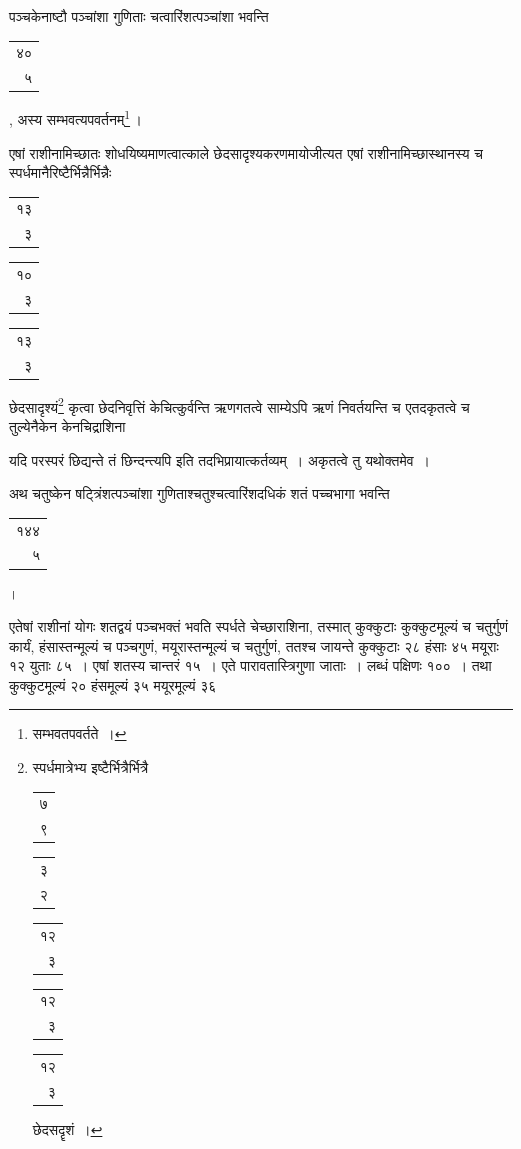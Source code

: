 \documentclass[10pt, openany]{book}
\begin{document}
{{{पञ्चकेनाष्टौ पञ्चांशा गुणिताः चत्वारिंशत्पञ्चांशा भवन्ति\begin{tabular}{r}४०\\ ५ \end{tabular}, अस्य
सम्भवत्यपवर्तनम्\renewcommand{\thefootnote}{\s ६}\footnote{\s सम्भवतपवर्तते~।}\,।}
{एषां राशीनामिच्छातः शोधयिष्यमाणत्वात्काले छेदसादृश्यकरणमायोजीत्यत एषां
राशीनामिच्छास्थानस्य च स्पर्धमानैरिष्टैर्भिन्नैर्भिन्नैः\begin{tabular}{r|}१३\\ ३ \end{tabular}\begin{tabular}{r|}१०\\ ३\end{tabular}\begin{tabular}{r}१३\\ ३\end{tabular}छेदसादृश्यं\renewcommand{\thefootnote}{\s ७}\footnote{\s स्पर्धमात्रेभ्य इष्टैर्भित्रैर्भित्रै\begin{tabular}{r|}७\\ ९\end{tabular}\begin{tabular}{r|}३\\ २\end{tabular}\begin{tabular}{r|}१२\\३\end{tabular}\begin{tabular}{r|} १२\\३\end{tabular}\begin{tabular}{r} १२\\३\end{tabular} छेदसदॄशं~।} कृत्वा छेदनिवृत्तिं केचित्कुर्वन्ति ऋणगतत्वे साम्येऽपि ऋणं निवर्तयन्ति च एतदकृतत्वे च
तुल्येनैकेन केनचिद्राशिना}
{यदि परस्परं छिद्यन्ते तं छिन्दन्त्यपि इति तदभिप्रायात्कर्तव्यम्~।
अकृतत्वे तु यथोक्तमेव~।}
{अथ चतुष्केन षट्त्रिंशत्पञ्चांशा गुणिताश्चतुश्चत्वारिंशदधिकं शतं
पच्चभागा भवन्ति\begin{tabular}{r}१४४\\ ५\end{tabular}।}
{एतेषां राशीनां योगः शतद्वयं पञ्चभक्तं भवति स्पर्धते चेच्छाराशिना,
तस्मात् कुक्कुटाः}
{कुक्कुटमूल्यं च चतुर्गुणं कार्यं, हंसास्तन्मूल्यं च पञ्चगुणं,
मयूरास्तन्मूल्यं च चतुर्गुणं, ततश्च}
{जायन्ते कुक्कुटाः २८ हंसाः ४५ मयूराः १२ युताः ८५~। एषां शतस्य चान्तरं
१५~। एते पारावतास्त्रिगुणा जाताः~। लब्धं पक्षिणः १००~। तथा कुक्कुटमूल्यं २०
हंसमूल्यं ३५ मयूरमूल्यं ३६}
}}
\end{document}
